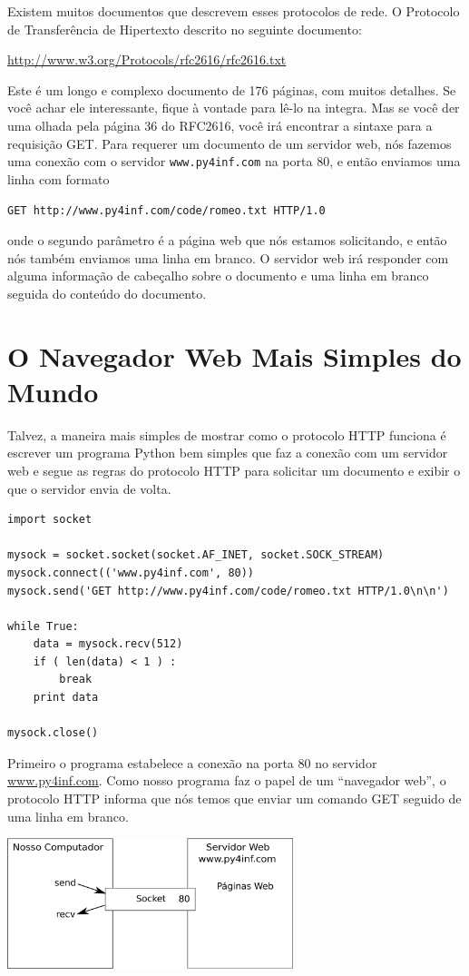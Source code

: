 Existem muitos documentos que descrevem esses protocolos de rede.  O Protocolo
de Transferência de Hipertexto descrito no seguinte documento:

\url{http://www.w3.org/Protocols/rfc2616/rfc2616.txt}

Este é um longo e complexo documento de 176 páginas, com muitos detalhes.  Se
você achar ele interessante, fique à vontade para lê-lo na integra.  Mas se
você der uma olhada pela página 36 do RFC2616, você irá encontrar a sintaxe
para a requisição GET.  Para requerer um documento de um servidor web, nós
fazemos uma conexão com o servidor {\tt www.py4inf.com} na porta 80, e então
enviamos uma linha com formato

{\tt GET http://www.py4inf.com/code/romeo.txt HTTP/1.0 }

onde o segundo parâmetro é a página web que nós estamos solicitando, e então
nós também enviamos uma linha em branco.  O servidor web irá responder com
alguma informação de cabeçalho sobre o documento e uma linha em branco seguida
do conteúdo do documento.

\section{O Navegador Web Mais Simples do Mundo}

Talvez, a maneira mais simples de mostrar como o protocolo HTTP funciona é
escrever um programa Python bem simples que faz a conexão com um servidor web
e segue as regras do protocolo HTTP para solicitar um documento e exibir o
que o servidor envia de volta.

\beforeverb
\begin{verbatim}
import socket

mysock = socket.socket(socket.AF_INET, socket.SOCK_STREAM)
mysock.connect(('www.py4inf.com', 80))
mysock.send('GET http://www.py4inf.com/code/romeo.txt HTTP/1.0\n\n')

while True:
    data = mysock.recv(512)
    if ( len(data) < 1 ) :
        break
    print data

mysock.close()
\end{verbatim}
\afterverb
%
Primeiro o programa estabelece a conexão na porta 80 no 
servidor \url{www.py4inf.com}.
Como nosso programa faz o papel de um ``navegador web'', o protocolo HTTP
informa que nós temos que enviar um comando GET seguido de uma linha em branco.

\beforefig
\centerline{\includegraphics[height=1.50in]{figs2/socket.eps}}
\afterfig

